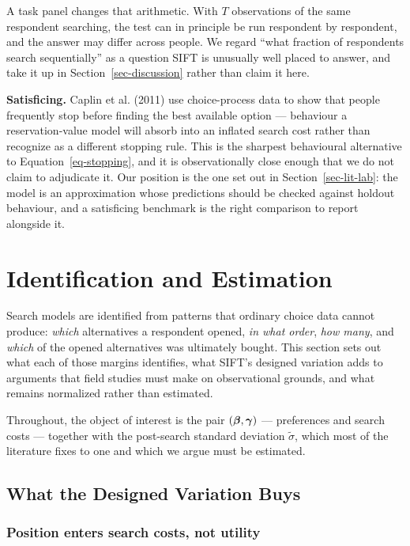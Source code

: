 \documentclass[
  letterpaper,
  DIV=11,
  numbers=noendperiod]{scrartcl}
\begin{document}
A task panel changes that arithmetic. With \(T\) observations of the
same respondent searching, the test can in principle be run respondent
by respondent, and the answer may differ across people. We regard ``what
fraction of respondents search sequentially'' as a question SIFT is
unusually well placed to answer, and take it up in
Section~\ref{sec-discussion} rather than claim it here.

\textbf{Satisficing.} Caplin et al. (2011) use choice-process data to
show that people frequently stop before finding the best available
option --- behaviour a reservation-value model will absorb into an
inflated search cost rather than recognize as a different stopping rule.
This is the sharpest behavioural alternative to
Equation~\ref{eq-stopping}, and it is observationally close enough that
we do not claim to adjudicate it. Our position is the one set out in
Section~\ref{sec-lit-lab}: the model is an approximation whose
predictions should be checked against holdout behaviour, and a
satisficing benchmark is the right comparison to report alongside it.

\section{Identification and Estimation}\label{sec-estimation}

Search models are identified from patterns that ordinary choice data
cannot produce: \emph{which} alternatives a respondent opened, \emph{in
what order}, \emph{how many}, and \emph{which} of the opened
alternatives was ultimately bought. This section sets out what each of
those margins identifies, what SIFT's designed variation adds to
arguments that field studies must make on observational grounds, and
what remains normalized rather than estimated.

Throughout, the object of interest is the pair \((\boldsymbol{\beta}, \boldsymbol{\gamma})\)
--- preferences and search costs --- together with the post-search
standard deviation \(\tilde\sigma\), which most of the literature fixes
to one and which we argue must be estimated.

\subsection{What the Designed Variation Buys}\label{sec-est-variation}

\subsubsection{Position enters search costs, not
utility}\label{position-enters-search-costs-not-utility}
\end{document}
